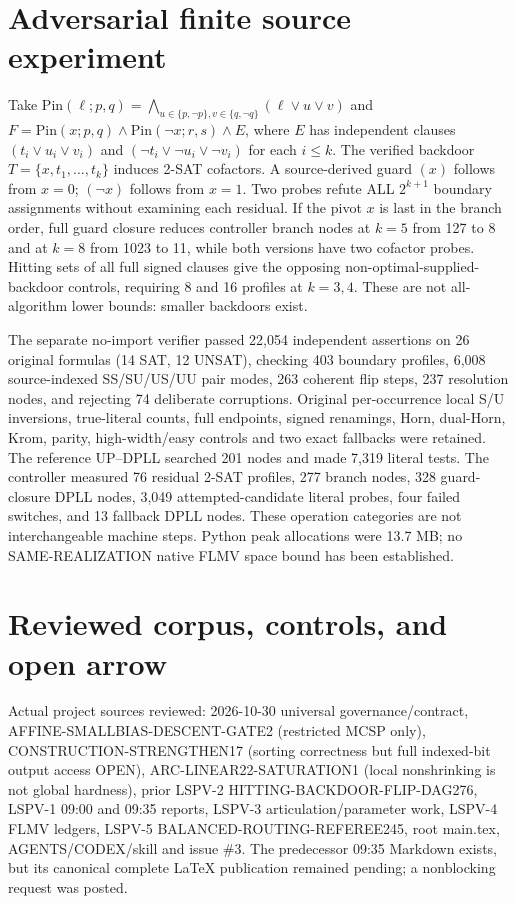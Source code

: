 \documentclass[11pt]{article}
\begin{document}
\section{Adversarial finite source experiment}
Take $\mathrm{Pin}(\ell;p,q)=\bigwedge_{u\in\{p,\neg p\},v\in\{q,\neg q\}}(\ell\vee u\vee v)$ and $F=\mathrm{Pin}(x;p,q)\land\mathrm{Pin}(\neg x;r,s)\land E$, where $E$ has independent clauses $(t_i\vee u_i\vee v_i)$ and $(\neg t_i\vee\neg u_i\vee\neg v_i)$ for each $i\le k$. The verified backdoor $T=\{x,t_1,\ldots,t_k\}$ induces 2-SAT cofactors. A source-derived guard $(x)$ follows from $x=0$; $(\neg x)$ follows from $x=1$. Two probes refute ALL $2^{k+1}$ boundary assignments without examining each residual. If the pivot $x$ is last in the branch order, full guard closure reduces controller branch nodes at $k=5$ from 127 to 8 and at $k=8$ from 1023 to 11, while both versions have two cofactor probes. Hitting sets of all full signed clauses give the opposing non-optimal-supplied-backdoor controls, requiring 8 and 16 profiles at $k=3,4$. These are not all-algorithm lower bounds: smaller backdoors exist.

The separate no-import verifier passed 22,054 independent assertions on 26 original formulas (14 SAT, 12 UNSAT), checking 403 boundary profiles, 6,008 source-indexed SS/SU/US/UU pair modes, 263 coherent flip steps, 237 resolution nodes, and rejecting 74 deliberate corruptions. Original per-occurrence local S/U inversions, true-literal counts, full endpoints, signed renamings, Horn, dual-Horn, Krom, parity, high-width/easy controls and two exact fallbacks were retained. The reference UP--DPLL searched 201 nodes and made 7,319 literal tests. The controller measured 76 residual 2-SAT profiles, 277 branch nodes, 328 guard-closure DPLL nodes, 3,049 attempted-candidate literal probes, four failed switches, and 13 fallback DPLL nodes. These operation categories are not interchangeable machine steps. Python peak allocations were 13.7 MB; no SAME-REALIZATION native FLMV space bound has been established.

\section{Reviewed corpus, controls, and open arrow}
Actual project sources reviewed: 2026-10-30 universal governance/contract, AFFINE-SMALLBIAS-DESCENT-GATE2 (restricted MCSP only), CONSTRUCTION-STRENGTHEN17 (sorting correctness but full indexed-bit output access OPEN), ARC-LINEAR22-SATURATION1 (local nonshrinking is not global hardness), prior LSPV-2 HITTING-BACKDOOR-FLIP-DAG276, LSPV-1 09:00 and 09:35 reports, LSPV-3 articulation/parameter work, LSPV-4 FLMV ledgers, LSPV-5 BALANCED-ROUTING-REFEREE245, root main.tex, AGENTS/CODEX/skill and issue \#3. The predecessor 09:35 Markdown exists, but its canonical complete LaTeX publication remained pending; a nonblocking request was posted.
\end{document}
